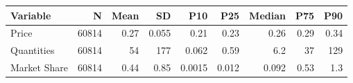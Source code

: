 \begin{tabular}{lrrrrrrrr}
\hline
\hline
Variable & N & Mean & SD & P10 & P25 & Median & P75 & P90 \\ 
\hline
Price & 60814 & 0.27 & 0.055 & 0.21 & 0.23 & 0.26 & 0.29 & 0.34 \\ 
Quantities & 60814 & 54 & 177 & 0.062 & 0.59 & 6.2 & 37 & 129 \\ 
Market Share & 60814 & 0.44 & 0.85 & 0.0015 & 0.012 & 0.092 & 0.53 & 1.3\\ 
\hline
\hline
\end{tabular}